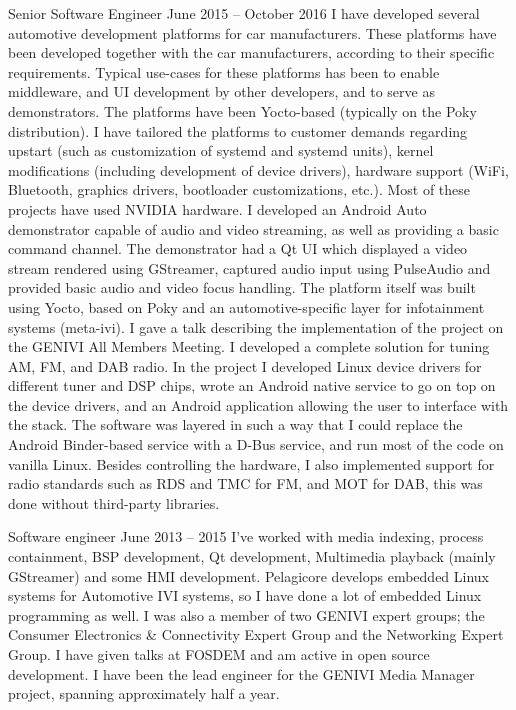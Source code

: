 \documentclass{twocolcv}
\begin{document}
           {Senior Software Engineer}
           {June 2015 -- October 2016}
           {
        {I have developed several automotive development platforms for car manufacturers. These platforms have been developed together with the car manufacturers, according to their specific requirements. Typical use-cases for these platforms has been to enable middleware, and UI development by other developers, and to serve as demonstrators. The platforms have been Yocto-based (typically on the Poky distribution). I have tailored the platforms to customer demands regarding upstart (such as customization of systemd and systemd units), kernel modifications (including development of device drivers), hardware support (WiFi, Bluetooth, graphics drivers, bootloader customizations, etc.). Most of these projects have used NVIDIA hardware.}
\newline\newline
{}
        {I developed an Android Auto demonstrator capable of audio and video streaming, as well as providing a basic command channel. The demonstrator had a Qt UI which displayed a video stream rendered using GStreamer, captured audio input using PulseAudio and provided basic audio and video focus handling. The platform itself was built using Yocto, based on Poky and an automotive-specific layer for infotainment systems (meta-ivi). I gave a talk describing the implementation of the project on the GENIVI All Members Meeting.}
\newline\newline
{}
        {I developed a complete solution for tuning AM, FM, and DAB radio. In the project I developed Linux device drivers for different tuner and DSP chips, wrote an Android native service to go on top on the device drivers, and an Android application allowing the user to interface with the stack. The software was layered in such a way that I could replace the Android Binder-based service with a D-Bus service, and run most of the code on vanilla Linux. Besides controlling the hardware, I also implemented support for radio standards such as RDS and TMC for FM, and MOT for DAB, this was done without third-party libraries.}
}

     {Software engineer}
     {June 2013 -- 2015}
     {I've worked with media indexing, process containment, BSP development, Qt development, Multimedia playback (mainly GStreamer) and some HMI development. Pelagicore develops embedded Linux systems for Automotive IVI systems, so I have done a lot of embedded Linux programming as well. I was also a member of two GENIVI expert groups; the Consumer Electronics \& Connectivity Expert Group and the Networking Expert Group. I have given talks at FOSDEM and am active in open source development. I have been the lead engineer for the GENIVI Media Manager project, spanning approximately half a year.}
\end{document}
